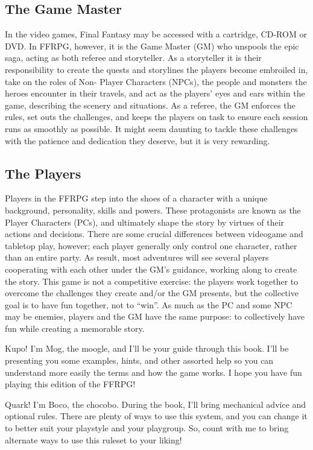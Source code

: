 \begin{multicols}{2}
\subsection{The Game Master}
In the video games, Final Fantasy may be
accessed with a cartridge, CD-ROM or DVD. In
FFRPG, however, it is the Game Master (GM) who
unspools the epic saga, acting as both referee and
storyteller. As a storyteller it is their responsibility
to create the quests and storylines the players
become embroiled in, take on the roles of Non-
Player Characters (NPCs), the people and
monsters the heroes encounter in their travels,
and act as the players' eyes and ears within the
game, describing the scenery and situations. As a
referee, the GM enforces the rules, set outs the
challenges, and keeps the players on task to ensure
each session runs as smoothly as possible. It might
seem daunting to tackle these challenges with the
patience and dedication they deserve, but it is very
rewarding.

\subsection{The Players}
Players in the FFRPG step into the shoes of a
character with a unique background, personality,
skills and powers. These protagonists are known
as the Player Characters (PCs), and ultimately
shape the story by virtues of their actions and
decisions. There are some crucial differences
between videogame and tabletop play, however;
each player generally only control one character,
rather than an entire party. As result, most
adventures will see several players cooperating
with each other under the GM's guidance, working
along to create the story. This game is not a
competitive exercise: the players work together to
overcome the challenges they create and/or the
GM presents, but the collective goal is to have fun
together, not to “win”. As much as the PC and some
NPC may be enemies, players and the GM have the
same purpose: to collectively have fun while
creating a memorable story.

\begin{mog}
Kupo! I'm Mog, the moogle, and I'll be your guide
through this book. I'll be presenting you some examples,
hints, and other assorted help so you can understand
more easily the terms and how the game works. I hope
you have fun playing this edition of the FFRPG!
\end{mog}

\begin{boco}
Quark! I'm Boco, the chocobo. During the
book, I'll bring mechanical advice and optional
rules. There are plenty of ways to use this system,
and you can change it to better suit your playstyle
and your playgroup. So, count with me to bring
alternate ways to use this ruleset to your liking!
\end{boco}
\end{multicols}


